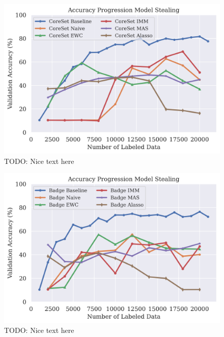 \begin{figure}[h]
    \centering
    \includegraphics[width=0.8\linewidth]{images/results_CALMS/mnist_label_coreset.png}
    \caption[Accuracy Comparison for Model Stealing on MNIST using the top1-label and the Active Learning strategy CoreSet]{TODO: Nice text here}
    \label{fig:CALMSMNISTLabelCoreSet}
\end{figure}

\begin{figure}[h]
    \centering
    \includegraphics[width=0.8\linewidth]{images/results_CALMS/mnist_label_badge.png}
    \caption[Accuracy Comparison for Model Stealing on MNIST using the top1-label and the Active Learning strategy Badge]{TODO: Nice text here}
    \label{fig:CALMSMNISTLabelBadge}
\end{figure}

